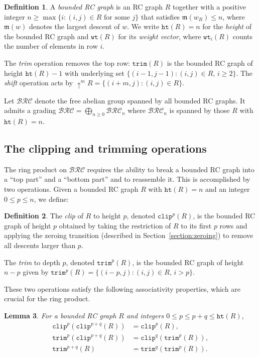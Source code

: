\documentclass{amsart}
\newtheorem{lemma}{Lemma}[section]
\theoremstyle{definition}
\newtheorem{definition}[lemma]{Definition}
\theoremstyle{remark}
\numberwithin{equation}{section}
\newcommand{\BRC}{\mathcal{BRC}}
\newcommand{\wof}[1]{w_{#1}}
\newcommand{\wtt}{\mathtt{wt}}
\newcommand{\hr}{\mathtt{ht}}
\newcommand{\trm}{\mathtt{trim}}
\newcommand{\shup}{{\uparrow}}
\newcommand{\maxd}{\mathfrak{m}}
\begin{document}
\begin{definition}\label{definition:boundedrc}
A \textit{bounded RC graph} is an RC graph $R$ together with a positive integer $n \geq \max\{i : (i, j) \in R \text{ for some } j\}$ that satisfies $\maxd(\wof{R}) \leq n$, where $\maxd(w)$ denotes the largest descent of $w$.  We write $\hr(R) = n$ for the \textit{height} of the bounded RC graph and $\wtt(R)$ for its \textit{weight vector}, where $\wtt_i(R)$ counts the number of elements in row $i$.

The \textit{trim} operation removes the top row: $\trm(R)$ is the bounded RC graph of height $\hr(R) - 1$ with underlying set $\{(i-1, j-1) : (i, j) \in R,\, i \geq 2\}$.  The \textit{shift} operation acts by $\shup^m R = \{(i + m, j) : (i, j) \in R\}$.
\end{definition}

Let $\BRC$ denote the free abelian group spanned by all bounded RC graphs.  It admits a grading $\BRC = \bigoplus_{n \geq 0} \BRC_n$ where $\BRC_n$ is spanned by those $R$ with $\hr(R) = n$.

\subsection{The clipping and trimming operations}

The ring product on $\BRC$ requires the ability to break a bounded RC graph into a ``top part'' and a ``bottom part'' and to reassemble it.  This is accomplished by two operations.  Given a bounded RC graph $R$ with $\hr(R) = n$ and an integer $0 \leq p \leq n$, we define:

\begin{definition}\label{definition:clip}
The \textit{clip} of $R$ to height $p$, denoted $\mathtt{clip}^p(R)$, is the bounded RC graph of height $p$ obtained by taking the restriction of $R$ to its first $p$ rows and applying the zeroing transition (described in Section~\ref{section:zeroing}) to remove all descents larger than $p$.

The \textit{trim} to depth $p$, denoted $\trm^p(R)$, is the bounded RC graph of height $n - p$ given by $\trm^p(R) = \{(i - p, j) : (i, j) \in R,\, i > p\}$.
\end{definition}

These two operations satisfy the following associativity properties, which are crucial for the ring product.

\begin{lemma}\label{lemma:clip-assoc}
For a bounded RC graph $R$ and integers $0 \leq p \leq p + q \leq \hr(R)$,
\begin{align}
\mathtt{clip}^p(\mathtt{clip}^{p+q}(R)) &= \mathtt{clip}^p(R), \label{eq:clip1}\\
\trm^p(\mathtt{clip}^{p+q}(R)) &= \mathtt{clip}^q(\trm^p(R)), \label{eq:clip2}\\
\trm^{p+q}(R) &= \trm^q(\trm^p(R)). \label{eq:clip3}
\end{align}
\end{lemma}
\end{document}
